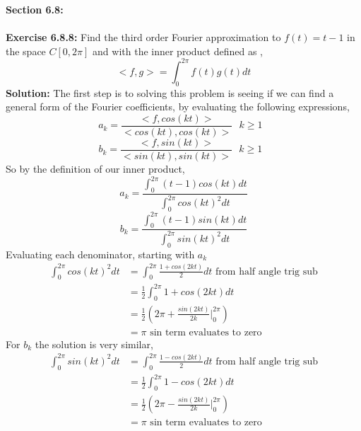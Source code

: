 \documentclass{amsart}
\begin{document}
\thispagestyle{fancy}





{\huge\textbf{Section 6.8:}}\\\\
\noindent\textbf{Exercise 6.8.8: } Find the third order Fourier approximation to $f(t) = t - 1$ in the space $C[0 , 2\pi]$ and with the inner product defined as ,
\begin{equation*}
<f,g> = \int_{0}^{2\pi}f(t)g(t)dt
\end{equation*}
\noindent \textbf{Solution: } The first step is to solving this problem is seeing if we can find a general form of the Fourier coefficients, by evaluating the following expressions,
\begin{equation*}
a_k = \frac{<f, cos(kt)>}{<cos(kt),cos(kt)>}  \text{  $k \geq 1$ }
\end{equation*}
\begin{equation*}
b_k = \frac{<f, sin(kt)>}{<sin(kt),sin(kt)>}  \text{ $k \geq 1$ }
\end{equation*}
So by the definition of our inner product, 
\begin{equation*}
a_k = \frac{ \int_{0}^{2\pi}(t - 1)cos(kt)dt  }{\int_{0}^{2\pi}cos(kt)^2dt}
\end{equation*}
\begin{equation*}
b_k = \frac{ \int_{0}^{2\pi}(t - 1)sin(kt)dt  }{\int_{0}^{2\pi}sin(kt)^2dt}
\end{equation*}
Evaluating each denominator, starting with $a_k$\\
\begin{align*}
\int_{0}^{2\pi}cos(kt)^2dt &= \int_{0}^{2\pi} \frac{1 + cos(2kt)}{2}dt \text{  from half angle trig sub}\\
&= \frac{1}{2} \int_{0}^{2\pi}1 + cos(2kt)dt\\
& = \frac{1}{2}(2\pi + \frac{sin(2kt)}{2k} |_{0}^{2\pi})\\
& = \pi   \text{ sin term evaluates to zero}
\end{align*}
For $b_k$ the solution is very similar,
\begin{align*}
\int_{0}^{2\pi}sin(kt)^2dt &= \int_{0}^{2\pi} \frac{1 - cos(2kt)}{2}dt \text{  from half angle trig sub}\\
&= \frac{1}{2} \int_{0}^{2\pi}1 - cos(2kt)dt\\
& = \frac{1}{2}(2\pi  - \frac{sin(2kt)}{2k} |_{0}^{2\pi})\\
& = \pi   \text{ sin term evaluates to zero}
\end{align*}
\end{document}
